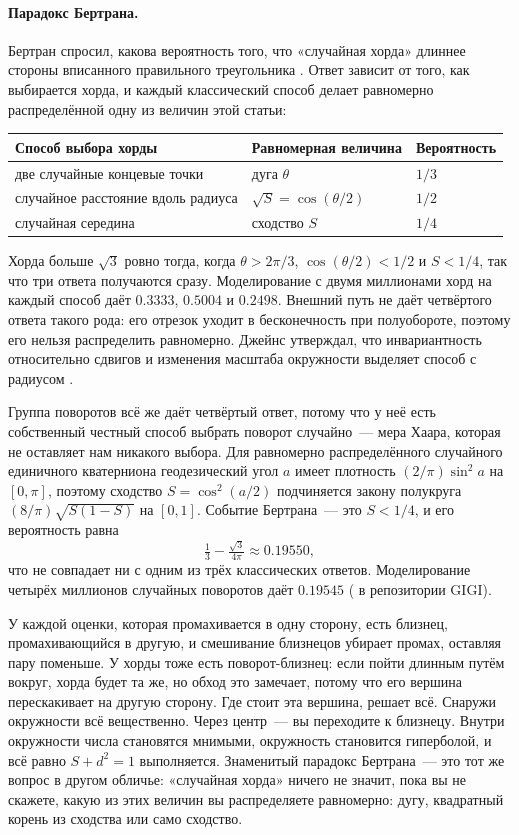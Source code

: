 \paragraph{Парадокс Бертрана.} Бертран спросил, какова вероятность того, что «случайная хорда»
длиннее стороны вписанного правильного треугольника \cite{bertrand}. Ответ
зависит от того, как выбирается хорда, и каждый классический способ делает равномерно распределённой
одну из величин этой статьи:
\begin{center}\small
\begin{tabular}{lll}\toprule
Способ выбора хорды & Равномерная величина & Вероятность \\ \midrule
две случайные концевые точки & дуга $\theta$ & $1/3$ \\
случайное расстояние вдоль радиуса & $\sqrt S=\cos(\theta/2)$ & $1/2$ \\
случайная середина & сходство $S$ & $1/4$ \\
\bottomrule\end{tabular}
\end{center}
Хорда больше $\sqrt3$ ровно тогда, когда $\theta>2\pi/3$, $\cos(\theta/2)<1/2$ и $S<1/4$, так что
три ответа получаются сразу. Моделирование с двумя миллионами хорд на каждый способ даёт
$0.3333$, $0.5004$ и $0.2498$. Внешний путь не даёт четвёртого ответа такого рода: его отрезок уходит в
бесконечность при полуобороте, поэтому его нельзя распределить равномерно. Джейнс утверждал, что инвариантность
относительно сдвигов и изменения масштаба окружности выделяет способ с радиусом \cite{jaynes}.

Группа поворотов всё же даёт четвёртый ответ, потому что у неё есть собственный честный способ
выбрать поворот случайно~--- мера Хаара, которая не оставляет нам никакого выбора. Для равномерно
распределённого случайного единичного кватерниона геодезический угол $a$ имеет плотность $(2/\pi)\sin^2a$ на $[0,\pi]$, поэтому
сходство $S=\cos^2(a/2)$ подчиняется закону полукруга $(8/\pi)\sqrt{S(1-S)}$ на $[0,1]$. Событие
Бертрана~--- это $S<1/4$, и его вероятность равна
\[
\tfrac13-\tfrac{\sqrt3}{4\pi}\approx0.19550,
\]
что не совпадает ни с одним из трёх классических ответов. Моделирование четырёх миллионов случайных поворотов даёт
$0.19545$ ( в репозитории GIGI).

\begin{plain}
У каждой оценки, которая промахивается в одну сторону, есть близнец, промахивающийся в другую, и смешивание
близнецов убирает промах, оставляя пару поменьше. У хорды тоже есть поворот-близнец: если пойти длинным
путём вокруг, хорда будет та же, но обход это замечает, потому что его вершина перескакивает на
другую сторону. Где стоит эта вершина, решает всё. Снаружи окружности всё вещественно.
Через центр~--- вы переходите к близнецу. Внутри окружности числа становятся мнимыми,
окружность становится гиперболой, и всё равно $S+d^2=1$ выполняется. Знаменитый парадокс Бертрана~--- это
тот же вопрос в другом обличье: «случайная хорда» ничего не значит, пока вы не скажете, какую из этих
величин вы распределяете равномерно: дугу, квадратный корень из сходства или само
сходство.
\end{plain}

